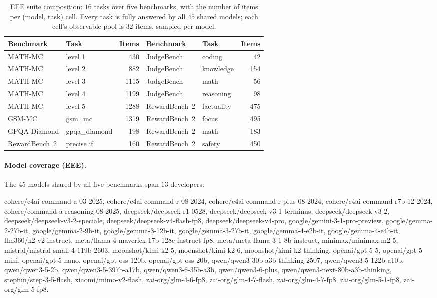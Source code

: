 \documentclass{article}
\theoremstyle{definition}
\theoremstyle{remark}
\theoremstyle{plain}
\begin{document}
\begin{table}[h]
\centering
\caption{EEE suite composition: $16$ tasks over five benchmarks, with the number of items
per (model, task) cell. Every task is fully answered by all $45$ shared models; each
cell's observable pool is $32$ items, sampled per model.}
\label{tab:eeesuite}
\footnotesize
\begin{tabular}{llr @{\hspace{2em}} llr}
\toprule
Benchmark & Task & Items & Benchmark & Task & Items \\
\midrule
MATH-MC & level 1 & 430 & JudgeBench & coding & 42 \\
MATH-MC & level 2 & 882 & JudgeBench & knowledge & 154 \\
MATH-MC & level 3 & 1115 & JudgeBench & math & 56 \\
MATH-MC & level 4 & 1199 & JudgeBench & reasoning & 98 \\
MATH-MC & level 5 & 1288 & RewardBench~2 & factuality & 475 \\
GSM-MC & gsm\_mc & 1319 & RewardBench~2 & focus & 495 \\
GPQA-Diamond & gpqa\_diamond & 198 & RewardBench~2 & math & 183 \\
RewardBench~2 & precise if & 160 & RewardBench~2 & safety & 450 \\
\bottomrule
\end{tabular}
\end{table}

\paragraph{Model coverage (EEE).} The $45$ models shared by all five benchmarks span $13$
developers:
{\footnotesize\ttfamily\raggedright cohere/c4ai-command-a-03-2025, cohere/c4ai-command-r-08-2024,
cohere/c4ai-command-r-plus-08-2024, cohere/c4ai-command-r7b-12-2024,
cohere/command-a-reasoning-08-2025, deepseek/deepseek-r1-0528,
deepseek/deepseek-v3-1-terminus, deepseek/deepseek-v3-2, deepseek/deepseek-v3-2-speciale,
deepseek/deepseek-v4-flash-fp8, deepseek/deepseek-v4-pro, google/gemini-3-1-pro-preview,
google/gemma-2-27b-it, google/gemma-2-9b-it, google/gemma-3-12b-it, google/gemma-3-27b-it,
google/gemma-4-e2b-it, google/gemma-4-e4b-it, llm360/k2-v2-instruct,
meta/llama-4-maverick-17b-128e-instruct-fp8, meta/meta-llama-3-1-8b-instruct,
minimax/minimax-m2-5, mistral/mistral-small-4-119b-2603, moonshot/kimi-k2-5,
moonshot/kimi-k2-6, moonshot/kimi-k2-thinking, openai/gpt-5-5, openai/gpt-5-mini,
openai/gpt-5-nano, openai/gpt-oss-120b, openai/gpt-oss-20b,
qwen/qwen3-30b-a3b-thinking-2507, qwen/qwen3-5-122b-a10b, qwen/qwen3-5-2b,
qwen/qwen3-5-397b-a17b, qwen/qwen3-6-35b-a3b, qwen/qwen3-6-plus,
qwen/qwen3-next-80b-a3b-thinking, stepfun/step-3-5-flash, xiaomi/mimo-v2-flash,
zai-org/glm-4-6-fp8, zai-org/glm-4-7-flash, zai-org/glm-4-7-fp8, zai-org/glm-5-1-fp8,
zai-org/glm-5-fp8.\par}
\end{document}
